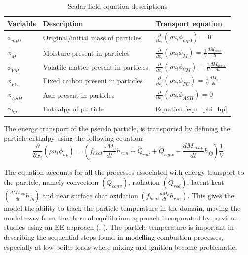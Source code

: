 \documentclass{webofc}
\begin{document}
\begin{table}[h!]
\centering
\caption{Scalar field equation descriptions}\label{tab_scalars}       
\begin{tabular}{lll}
\hline
Variable &Description& Transport equation \\
\hline
$\phi_{mp0}$ &Original/initial mass of particles& $\frac{\partial}{\partial x_{i}}(\rho u_{i} \phi_{mp0})=0$\\
$\phi_{M}$&Moisture present in particles&$\frac{\partial}{\partial x_{i}}(\rho u_{i} \phi_{M})=\frac{1}{V} \frac{dM_{evap}}{dt}$\\
$\phi_{VM}$&Volatile matter present in particles&  $\frac{\partial}{\partial x_{i}}(\rho u_{i} \phi_{VM})=\frac{1}{V}\frac{dM_{devol}}{dt}$\\
$\phi_{FC}$&Fixed carbon present in particles&$\frac{\partial}{\partial x_{i}}(\rho u_{i} \phi_{FC})=\frac{1}{V}\frac{dM_c}{dt}$\\
$\phi_{ASH}$&Ash present in particles&$\frac{\partial}{\partial x_{i}}(\rho u_{i} \phi_{ASH})=0$\\
$\phi_{hp}$&Enthalpy of particle&Equation \eqref{eqn_phi_hp}\\
\hline
\end{tabular}
\end{table}

The energy transport of the pseudo particle, is transported by defining the particle enthalpy using the following equation:
\begin{equation}\label{eqn_phi_hp}
\frac{\partial}{\partial x_{i}}(\rho u_{i} \phi_{hp})=\left(f_{heat}\frac{dM_{c}}{dt}h_{rxn} + \dot{Q}_{rad} + \dot{Q}_{conv} - \frac{dM_{evap}}{dt}h_{fg}\right)\frac{1}{V}
\end{equation}

The equation accounts for all the processes associated with energy transport to the particle, namely convection $\left(\dot{Q}_{conv}\right)$, radiation $\left(\dot{Q}_{rad}\right)$, latent heat $\left(\frac{dM_{evap}}{dt}h_{fg}\right)$ and near surface char oxidation $\left(f_{heat}\frac{dM_{c}}{dt}h_{rxn}\right)$. This gives the model the ability to track the particle temperature in the domain, moving the model away from the thermal equilibrium approach incorporated by previous studies using an EE approach (\cite{epple}, \cite{knaus}). The particle temperature is important in describing the sequential steps found in modelling combustion processes, especially at low boiler loads where mixing and ignition become problematic.
\end{document}
